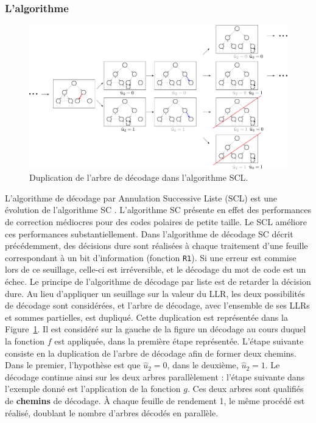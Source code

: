 \subsubsection{L'algorithme}
\begin{figure}[t]
\centering
\includegraphics[width=1\textwidth]{main/ch1_fig/scl}
\caption{Duplication de l'arbre de décodage dans l'algorithme SCL.}
\label{fig:scl}
\end{figure}
L'algorithme de décodage par Annulation Successive Liste (SCL) est une évolution de l'algorithme SC \cite{tal_how_2013}. L'algorithme SC présente en effet des performances de correction médiocres pour des codes polaires de petite taille. Le SCL améliore ces performances substantiellement. Dans l'algorithme de décodage SC décrit précédemment, des décisions dure sont réalisées à chaque traitement d'une feuille correspondant à un bit d'information (fonction \texttt{R1}). Si une erreur est commise lors de ce seuillage, celle-ci est irréversible, et le décodage du mot de code est un échec. Le principe de l'algorithme de décodage par liste est de retarder la décision dure. Au lieu d'appliquer un seuillage sur la valeur du LLR, les deux possibilités de décodage sont considérées, et l'arbre de décodage, avec l'ensemble de ses LLRs et sommes partielles, est dupliqué. Cette duplication est représentée dans la Figure~\ref{fig:scl}. Il est considéré sur la gauche de la figure un décodage au cours duquel la fonction $f$ est appliquée, dans la première étape représentée. L'étape suivante consiste en la duplication de l'arbre de décodage afin de former deux chemins. Dans le premier, l'hypothèse est que $\hat{u}_2=0$, dans le deuxième, $\hat{u}_2=1$. Le décodage continue ainsi sur les deux arbres parallèlement : l'étape suivante dans l'exemple donné est l'application de la fonction $g$. Ces deux arbres sont qualifiés de \textbf{chemins} de décodage. \`A chaque feuille de rendement 1, le même procédé est réalisé, doublant le nombre d'arbres décodés en parallèle.


